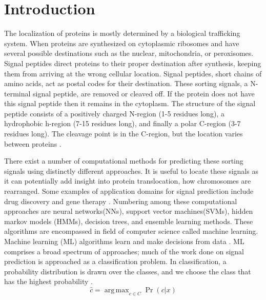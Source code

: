 \documentclass[10pt,letterpaper]{article}
\DeclareMathOperator*{\argmax}{arg\,max}
\begin{document}
	
	
	\linenumbers
	
	\section*{Introduction}
	The localization of proteins is mostly determined by a biological trafficking system. When proteins are synthesized on cytoplasmic ribosomes and have several possible destinations such as the nuclear, mitochondria, or peroxisomes. Signal peptides direct proteins to their proper destination after synthesis, keeping them from arriving at the wrong cellular location. Signal peptides, short chains of amino acids, act as postal codes for their destination. These sorting signals, a N-terminal signal peptide, are removed or cleaved off. If the protein does not have this signal peptide then it remains in the cytoplasm. The structure of the signal peptide consists of a positively charged N-region (1-5 residues long), a hydrophobic h-region (7-15 residues long), and finally a polar C-region (3-7 residues long). The cleavage point is in the C-region, but the location varies between proteins \cite{thesis}. 
	
	There exist a number of computational methods for predicting these sorting signals using distinctly different approaches. It is useful to locate these signals as it can potentially add insight into protein translocation, how chromosomes are rearranged. Some examples of application domains for signal prediction include drug discovery and gene therapy \cite{thesis}. Numbering among these computational approaches are neural networks(NNs), support vector machines(SVMs), hidden markov models (HMMs), decision trees, and ensemble learning methods. These algorithms are encompassed in field of computer science called machine learning. Machine learning (ML) algorithms learn and make decisions from data \cite{wikipedia}. ML comprises a broad spectrum of approaches; much of the work done on signal prediction is approached as a classification problem. In classification, a probability distribution is drawn over the classes, and we choose the class that has the highest probability \cite{jurafsky}. $$ \hat{c} = \argmax_{c \in C}{ \Pr(c \vert x)} $$
	
\end{document}

